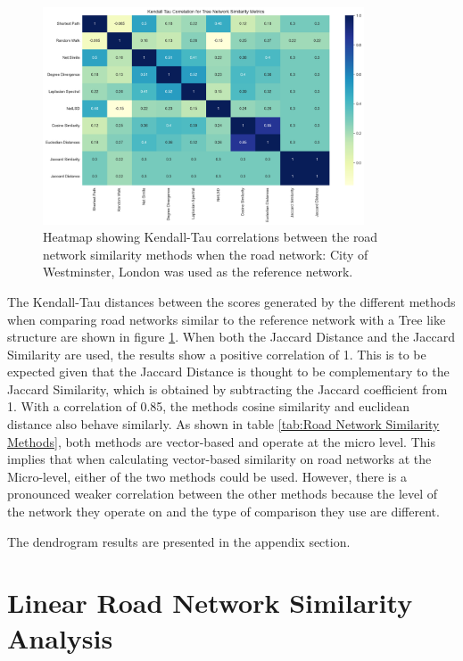 \begin{figure}[!ht]
\centering
\includegraphics[width=0.85\textwidth,center]{picture/Tree/tree2.png}
\caption[Heatmap showing Kendall-Tau correlations between the road network similarity methods for Radial Road Networks]{Heatmap showing Kendall-Tau correlations between the road network similarity methods when the road network: City of Westminster, London was used as the reference network.}
\label{fig:network ranking tree}
\end{figure}

The Kendall-Tau distances between the scores generated by the different methods when comparing road networks similar to the reference network with a Tree like structure are shown in figure \ref{fig:network ranking tree}. When both the Jaccard Distance and the Jaccard Similarity are used, the results show a positive correlation of 1. This is to be expected given that the Jaccard Distance is thought to be complementary to the Jaccard Similarity, which is obtained by subtracting the Jaccard coefficient from 1. With a correlation of 0.85, the methods cosine similarity and euclidean distance also behave similarly. As shown in table \ref{tab:Road Network Similarity Methods}, both methods are vector-based and operate at the micro level. This implies that when calculating vector-based similarity on road networks at the Micro-level, either of the two methods could be used. However, there is a pronounced weaker correlation between the other methods because the level of the network they operate on and the type of comparison they use are different.

The dendrogram results are presented in the appendix section.


\section{Linear Road Network Similarity Analysis}

